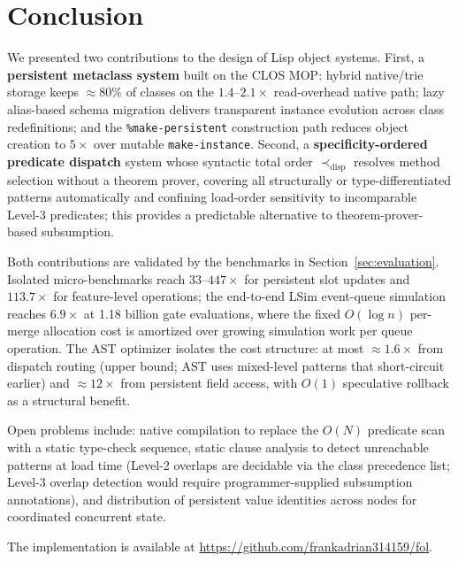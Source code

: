 \documentclass[sigconf,nonacm]{acmart}
\begin{document}
\section{Conclusion}
\label{sec:conclusion}

We presented two contributions to the design of Lisp object systems. First, a \textbf{persistent metaclass system} built on the CLOS MOP: hybrid native/trie storage keeps ${\approx}80\%$ of classes on the $1.4$--$2.1{\times}$ read-overhead native path; lazy alias-based schema migration delivers transparent instance evolution across class redefinitions; and the \texttt{\%make-persistent} construction path reduces object creation to $5{\times}$ over mutable \texttt{make-instance}. Second, a \textbf{specificity-ordered predicate dispatch} system whose syntactic total order $\prec_{\text{disp}}$ resolves method selection without a theorem prover, covering all structurally or type-differentiated patterns automatically and confining load-order sensitivity to incomparable Level-3 predicates; this provides a predictable alternative to theorem-prover-based subsumption.

Both contributions are validated by the benchmarks in Section~\ref{sec:evaluation}. Isolated micro-benchmarks reach $33$--$447{\times}$ for persistent slot updates and $113.7{\times}$ for feature-level operations; the end-to-end LSim event-queue simulation reaches $6.9{\times}$ at 1.18 billion gate evaluations, where the fixed $O(\log n)$ per-merge allocation cost is amortized over growing simulation work per queue operation. The AST optimizer isolates the cost structure: at most ${\approx}1.6{\times}$ from dispatch routing (upper bound; AST uses mixed-level patterns that short-circuit earlier) and ${\approx}12{\times}$ from persistent field access, with $O(1)$ speculative rollback as a structural benefit.

Open problems include: native compilation to replace the $O(N)$ predicate scan with a static type-check sequence, static clause analysis to detect unreachable patterns at load time (Level-2 overlaps are decidable via the class precedence list; Level-3 overlap detection would require programmer-supplied subsumption annotations), and distribution of persistent value identities across nodes for coordinated concurrent state.

The implementation is available at \url{https://github.com/frankadrian314159/fol}.

\balance



\end{document}
